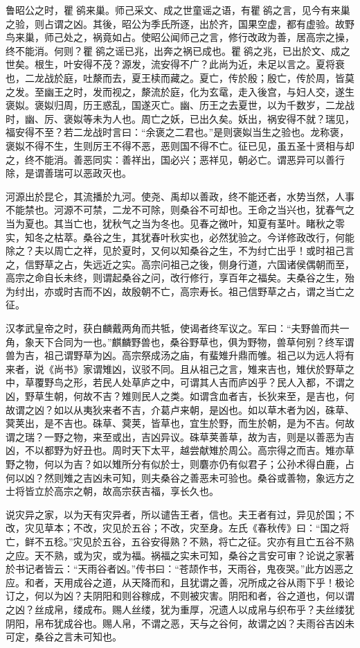 \documentclass[]{article}
\begin{document}
鲁昭公之时，瞿鹆来巢。师己采文、成之世童谣之语，有瞿鹆之言，见今有来巢之验，则占谓之凶。其後，昭公为季氏所逐，出於齐，国果空虚，都有虚验。故野鸟来巢，师己处之，祸竟如占。使昭公闻师己之言，修行改政为善，居高宗之操，终不能消。何则？瞿鹆之谣已兆，出奔之祸已成也。瞿鹆之兆，已出於文、成之世矣。根生，叶安得不茂？源发，流安得不广？此尚为近，未足以言之。夏将衰也，二龙战於庭，吐漦而去，夏王椟而藏之。夏亡，传於殷；殷亡，传於周，皆莫之发。至幽王之时，发而视之，漦流於庭，化为玄鼋，走入後宫，与妇人交，遂生褒姒。褒姒归周，历王惑乱，国遂灭亡。幽、历王之去夏世，以为千数岁，二龙战时，幽、厉、褒姒等未为人也。周亡之妖，已出久矣。妖出，祸安得不就？瑞见，福安得不至？若二龙战时言曰：``余褒之二君也。''是则褒姒当生之验也。龙称褒，褒姒不得不生，生则厉王不得不恶，恶则国不得不亡。征已见，虽五圣十贤相与却之，终不能消。善恶同实：善祥出，国必兴；恶祥见，朝必亡。谓恶异可以善行除，是谓善瑞可以恶政灭也。

河源出於昆仑，其流播於九河。使尧、禹却以善政，终不能还者，水势当然，人事不能禁也。河源不可禁，二龙不可除，则桑谷不可却也。王命之当兴也，犹春气之当为夏也。其当亡也，犹秋气之当为冬也。见春之微叶，知夏有茎叶。睹秋之零实，知冬之枯萃。桑谷之生，其犹春叶秋实也，必然犹验之。今详修政改行，何能除之？夫以周亡之祥，见於夏时，又何以知桑谷之生，不为纣亡出乎！或时祖己言之，信野草之占，失远近之实。高宗问祖己之後，侧身行道，六国诸侯偶朝而至，高宗之命自长未终，则谓起桑谷之问，改行修行，享百年之福矣。夫桑谷之生，殆为纣出，亦或时吉而不凶，故殷朝不亡，高宗寿长。祖己信野草之占，谓之当亡之征。

汉孝武皇帝之时，获白麟戴两角而共牴，使谒者终军议之。军曰：``夫野兽而共一角，象天下合同为一也。''麒麟野兽也，桑谷野草也，俱为野物，兽草何别？终军谓兽为吉，祖己谓野草为凶。高宗祭成汤之庙，有蜚雉升鼎而雊。祖己以为远人将有来者，说《尚书》家谓雉凶，议驳不同。且从祖己之言，雉来吉也，雉伏於野草之中，草覆野鸟之形，若民人处草庐之中，可谓其人吉而庐凶乎？民人入都，不谓之凶，野草生朝，何故不吉？雉则民人之类。如谓含血者吉，长狄来至，是吉也，何故谓之凶？如以从夷狄来者不吉，介葛卢来朝，是凶也。如以草木者为凶，硃草、蓂荚出，是不吉也。硃草、蓂荚，皆草也，宜生於野，而生於朝，是为不吉。何故谓之瑞？一野之物，来至或出，吉凶异议。硃草荚善草，故为吉，则是以善恶为吉凶，不以都野为好丑也。周时天下太平，越尝献雉於周公。高宗得之而吉。雉亦草野之物，何以为吉？如以雉所分有似於士，则麏亦仍有似君子；公孙术得白鹿，占何以凶？然则雉之吉凶未可知，则夫桑谷之善恶未可验也。桑谷或善物，象远方之士将皆立於高宗之朝，故高宗获吉福，享长久也。

说灾异之家，以为天有灾异者，所以谴告王者，信也。夫王者有过，异见於国；不改，灾见草本；不改，灾见於五谷；不改，灾至身。左氏《春秋传》曰：``国之将亡，鲜不五稔。''灾见於五谷，五谷安得熟？不熟，将亡之征。灾亦有且亡五谷不熟之应。天不熟，或为灾，或为福。祸福之实未可知，桑谷之言安可审？论说之家著於书记者皆云：``天雨谷者凶。''传书曰：``苍颉作书，天雨谷，鬼夜哭。''此方凶恶之应。和者，天用成谷之道，从天降而和，且犹谓之善，况所成之谷从雨下乎！极论订之，何以为凶？夫阴阳和则谷稼成，不则被灾害。阴阳和者，谷之道也，何以谓之凶？丝成帛，缕成布。赐人丝缕，犹为重厚，况遗人以成帛与织布乎？夫丝缕犹阴阳，帛布犹成谷也。赐人帛，不谓之恶，天与之谷何，故谓之凶？夫雨谷吉凶未可定，桑谷之言未可知也。
\end{document}
